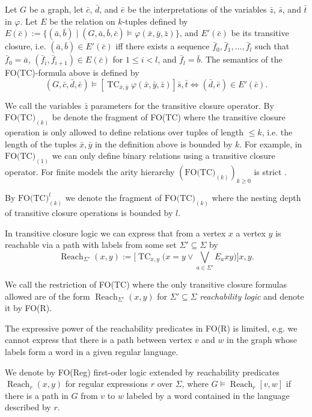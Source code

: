 \documentclass{LMCS}
\renewcommand{\phi}{\varphi}
\DeclareMathOperator{\TC}{TC}
\DeclareMathOperator{\Reach}{Reach}
\begin{document}
Let $G$ be a graph, let $\bar c$, $\bar d$, and $\bar e$ be the interpretations of the variables 
$\bar z$, $\bar s$, and $\bar t$ in $\phi$. Let $E$ be the relation on $k$-tuples defined by 
$E(\bar c):=\{(\bar a, \bar b) \mid (G, \bar a, \bar b, \bar c) \models \phi(\bar x, \bar y, \bar z)\}$,
and $E'(\bar c)$ be its transitive closure, i.e. $(\bar a, \bar b) \in E'(\bar c)$
iff there exists a sequence $\bar f_0, \bar f_1, \ldots, \bar f_l$ such that
$\bar f_0 = \bar a$, $(\bar f_i, \bar f_{i+1}) \in E(\bar c)$ for $ 1 \le i < l$, and
$\bar f_l = \bar b$. The semantics of the FO(TC)-formula above is defined by
\[(G, \bar c, \bar d, \bar e) \models \left[\TC_{\bar x, \bar y} \phi(\bar x, \bar y, 
\bar z)\right]\bar s, \bar t \Leftrightarrow  (\bar d, \bar e) \in E'(\bar c).\]

We call the variables $\bar z$ parameters for the transitive closure operator.
By $\textrm{FO(TC)}_{(k)}$ be denote the fragment of FO(TC) where the 
transitive closure operation is only allowed to define relations over tuples of 
length $\le k$, i.e. the length of the tuples $\bar x, \bar y$ in the
definition above is bounded by $k$. For example, in $\textrm{FO(TC)}_{(1)}$
we can only define binary relations using a transitive closure operator.
For finite models the arity hierarchy $(\textrm{FO(TC)}_{(k)})_{k \ge 0}$ is 
strict \cite{gro96}.

By $\textrm{FO(TC)}_{(k)}^l$ we denote the 
fragment of $\textrm{FO(TC)}_{(k)}$ where the nesting depth of transitive closure 
operations is bounded by $l$. 

In transitive closure logic we can express that from a vertex
$x$ a vertex $y$ is reachable via a path with labels from some set 
$\Sigma' \subseteq \Sigma$ by 
\[\Reach_{\Sigma'}(x,y):=\Big[\TC_{x,y} \big(x=y \vee \bigvee_{a \in \Sigma'} E_a xy\big)\Big]x,y.\] 

We call the restriction of FO(TC) where the only transitive closure formulas allowed are
of the form $\Reach_{\Sigma'}(x,y)$ for  $\Sigma' \subseteq \Sigma$ \emph{reachability logic} 
and denote it by FO(R).

 The expressive power of the reachability predicates in FO(R) is limited, 
 e.g. we cannot express that there is a path between vertex $v$ and $w$ in 
 the graph whose labels form a word in a given regular language. 

 We denote by FO(Reg) first-oder logic extended by reachability predicates 
 $\Reach_r(x,y)$ for regular expressions $r$ over $\Sigma$, where 
 $G \models \Reach_r[v,w]$ if there is a path in $G$ from $v$ to $w$
 labeled by a word contained in the language described by $r$.
\end{document}
